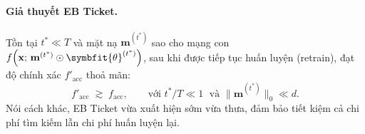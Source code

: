 \paragraph{\textbf{Giả thuyết EB Ticket.} \cite{earlybird}}
Tồn tại $t^* \ll T$ và mặt nạ $\mathbf{m}^{(t^*)}$ sao cho mạng con
$f\!\left(\mathbf{x};\,\mathbf{m}^{(t^*)} \odot \symbfit{\theta}^{(t^*)}\right)$,
sau khi được tiếp tục huấn luyện (retrain), đạt độ chính xác $f'_{\mathrm{acc}}$ thoả mãn:
\begin{equation}
    f'_{\mathrm{acc}} \;\gtrsim\; f_{\mathrm{acc}},
    \qquad \text{với } t^*/T \ll 1 \;\text{ và } \|\mathbf{m}^{(t^*)}\|_0 \ll d.
    \label{eq:eb_hypothesis}
\end{equation}
Nói cách khác, EB Ticket vừa xuất hiện sớm vừa thưa, đảm bảo tiết kiệm cả chi phí
tìm kiếm lẫn chi phí huấn luyện lại.

